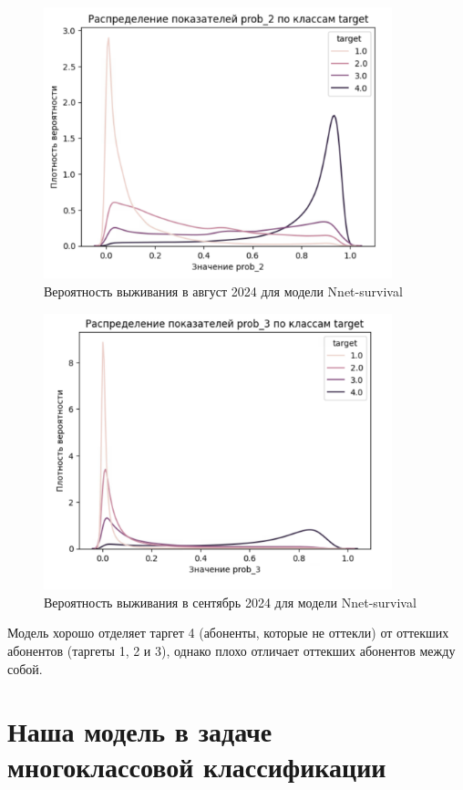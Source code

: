 \documentclass[a4paper,14pt,oneside,openany]{memoir}
\begin{document}
\begin{figure}[H]
	\includegraphics[width=0.9\textwidth]{../figures/prob_2_nnet.png}
	\caption{Вероятность выживания в август 2024 для модели Nnet-survival}
\end{figure}

\begin{figure}[H]
	\includegraphics[width=0.9\textwidth]{../figures/prob_3_nnet.png}
	\caption{Вероятность выживания в сентябрь 2024 для модели Nnet-survival}
\end{figure}

Модель хорошо отделяет таргет 4 (абоненты, которые не оттекли) от оттекших абонентов (таргеты 1, 2 и 3), однако плохо отличает оттекших абонентов между собой. 

\section{Наша модель в задаче многоклассовой классификации}
\end{document}
